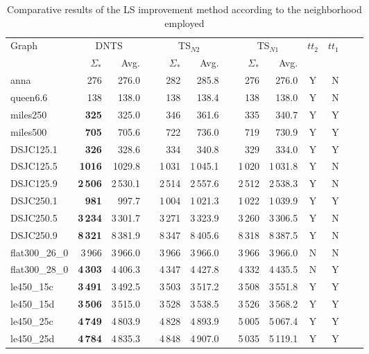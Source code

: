 \documentclass{elsart}
\begin{document}
\begin{table}[h]\begin{scriptsize}
\caption{Comparative results of the LS improvement method according to the neighborhood employed} \label{table_Multi_Single}
\begin{tabular}{lrrcrrcrrcrcr}
\hline
\multirow{2}{*}{Graph} & \multicolumn{2}{c}{DNTS} & &\multicolumn{2}{c}{TS$_{N2}$} & &\multicolumn{2}{c}{TS$_{N1}$} &\multirow{2}{*}{\emph{$tt_2$}} &\multirow{2}{*}{\emph{$tt_1$}}\\  
\cline{2-3} \cline{5-6} \cline{8-9} 
& $\Sigma_*$& Avg. & & $\Sigma_*$& Avg. & & $\Sigma_*$& Avg. \\
\hline
anna              &276 &276.0 &  &282 & 285.8 &  &276   & 276.0  &Y & N \\
queen6.6      & 138 & 138.0 &  &138 & 138.4 &   & 138  & 138.0  &Y &N\\
miles250        & \textbf{325} & 325.0 &   &346 & 361.6  &   & 335 & 340.7 &Y &Y\\
miles500        & \textbf{705} & 705.6 &  &722 & 736.0 &  & 719 & 730.9 &Y &Y \\
DSJC125.1        & \textbf{326}  & 328.6   & & 334  & 340.8   & & 329  & 334.0 &Y &Y\\
DSJC125.5        & \textbf{1016}  & 1029.8   & & 1\,031  & 1\,045.1   & & 1\,020  & 1\,031.8 &Y &N\\
DSJC125.9        & \textbf{2\,506}  & 2\,530.1   & & 2\,514  & 2\,557.6   & & 2\,512  & 2\,538.3 &Y &N\\
DSJC250.1         & \textbf{981}  & 997.7    &   & 1\,004  & 1\,021.3    &   & 1\,022  & 1\,039.9  &Y &Y \\
DSJC250.5          &\textbf{3\,234}  & 3\,301.7  &  &3\,271  & 3\,323.9  &  &3\,260  & 3\,306.5 &Y &N \\
DSJC250.9          &\textbf{8\,321}  & 8\,381.9  &  &8\,347  & 8\,405.6  &  &8\,318  & 8\,387.5 &Y &N \\
flat300\_26\_0      & 3\,966 & 3\,966.0  & & 3\,966 & 3\,966.0 & & 3\,966 & 3\,966.0 &N &N \\
flat300\_28\_0      &  \textbf{4\,303} & 4\,406.3 & &  4\,347 & 4\,427.8 & &  4\,332 & 4\,435.5  &N &Y\\
le450\_15c          & \textbf{3\,491} & 3\,492.5   & & 3\,503  & 3\,517.2  & & 3\,508 & 3\,551.8    &Y &Y\\
le450\_15d           &  \textbf{3\,506} & 3\,515.0  & &  3\,528 & 3\,538.5 & &  3\,526  & 3\,568.2 &Y &Y \\
le450\_25c        &\textbf{4\,749} & 4\,803.9 &   &4\,828 & 4\,893.9 & &5\,005 & 5\,067.4  &Y &Y\\
le450\_25d       & \textbf{4\,784} & 4\,835.3  &  & 4\,848 & 4\,907.0  &  & 5\,035 & 5\,119.1  &Y &Y\\
\hline
\end{tabular}
\end{scriptsize}
\end{table}
\end{document}
